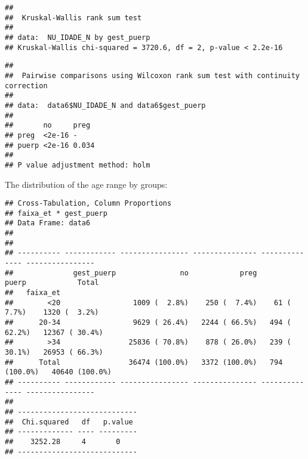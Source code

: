 \documentclass[
]{article}
\newenvironment{Shaded}{\begin{snugshade}}{\end{snugshade}}
\newcommand{\DataTypeTok}[1]{\textcolor[rgb]{0.13,0.29,0.53}{#1}}
\newcommand{\KeywordTok}[1]{\textcolor[rgb]{0.13,0.29,0.53}{\textbf{#1}}}
\newcommand{\NormalTok}[1]{#1}
\newcommand{\OperatorTok}[1]{\textcolor[rgb]{0.81,0.36,0.00}{\textbf{#1}}}
\newcommand{\OtherTok}[1]{\textcolor[rgb]{0.56,0.35,0.01}{#1}}
\newcommand{\StringTok}[1]{\textcolor[rgb]{0.31,0.60,0.02}{#1}}
\begin{document}
\begin{verbatim}
## 
##  Kruskal-Wallis rank sum test
## 
## data:  NU_IDADE_N by gest_puerp
## Kruskal-Wallis chi-squared = 3720.6, df = 2, p-value < 2.2e-16
\end{verbatim}

\begin{Shaded}
\end{Shaded}

\begin{verbatim}
## 
##  Pairwise comparisons using Wilcoxon rank sum test with continuity correction 
## 
## data:  data6$NU_IDADE_N and data6$gest_puerp 
## 
##       no     preg 
## preg  <2e-16 -    
## puerp <2e-16 0.034
## 
## P value adjustment method: holm
\end{verbatim}

The distribution of the age range by groups:

\begin{Shaded}
\end{Shaded}

\begin{verbatim}
## Cross-Tabulation, Column Proportions  
## faixa_et * gest_puerp  
## Data Frame: data6  
## 
## 
## ---------- ------------ ---------------- --------------- -------------- ----------------
##              gest_puerp               no            preg          puerp            Total
##   faixa_et                                                                              
##        <20                 1009 (  2.8%)    250 (  7.4%)    61 (  7.7%)    1320 (  3.2%)
##      20-34                 9629 ( 26.4%)   2244 ( 66.5%)   494 ( 62.2%)   12367 ( 30.4%)
##        >34                25836 ( 70.8%)    878 ( 26.0%)   239 ( 30.1%)   26953 ( 66.3%)
##      Total                36474 (100.0%)   3372 (100.0%)   794 (100.0%)   40640 (100.0%)
## ---------- ------------ ---------------- --------------- -------------- ----------------
## 
## ----------------------------
##  Chi.squared   df   p.value 
## ------------- ---- ---------
##    3252.28     4       0    
## ----------------------------
\end{verbatim}
\end{document}

